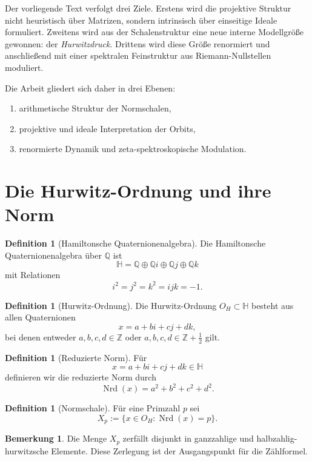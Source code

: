 \documentclass[a4paper,12pt]{article}
\theoremstyle{definition}
\newtheorem{definition}[satz]{Definition}
\newtheorem{bemerkung}[satz]{Bemerkung}
\numberwithin{equation}{section}
\newcommand{\OH}{O_H}
\newcommand{\HH}{\mathbb{H}}
\newcommand{\Q}{\mathbb{Q}}
\newcommand{\Z}{\mathbb{Z}}
\newcommand{\Nrd}{\operatorname{Nrd}}
\begin{document}
	Der vorliegende Text verfolgt drei Ziele. Erstens wird die projektive Struktur nicht heuristisch über Matrizen, sondern intrinsisch über einseitige Ideale formuliert. Zweitens wird aus der Schalenstruktur eine neue interne Modellgröße gewonnen: der \emph{Hurwitzdruck}. Drittens wird diese Größe renormiert und anschließend mit einer spektralen Feinstruktur aus Riemann-Nullstellen moduliert.
	
	Die Arbeit gliedert sich daher in drei Ebenen:
	
	\begin{enumerate}
		\item arithmetische Struktur der Normschalen,
		\item projektive und ideale Interpretation der Orbits,
		\item renormierte Dynamik und zeta-spektroskopische Modulation.
	\end{enumerate}
	
	\section{Die Hurwitz-Ordnung und ihre Norm}
	
	\begin{definition}[Hamiltonsche Quaternionenalgebra]
		Die Hamiltonsche Quaternionenalgebra über \(\Q\) ist
		\[
		\HH=\Q\oplus \Q i\oplus \Q j\oplus \Q k
		\]
		mit Relationen
		\[
		i^2=j^2=k^2=ijk=-1.
		\]
	\end{definition}
	
	\begin{definition}[Hurwitz-Ordnung]
		Die Hurwitz-Ordnung \(\OH\subset \HH\) besteht aus allen Quaternionen
		\[
		x=a+bi+cj+dk,
		\]
		bei denen entweder \(a,b,c,d\in \Z\) oder \(a,b,c,d\in \Z+\frac12\) gilt.
	\end{definition}
	
	\begin{definition}[Reduzierte Norm]
		Für
		\[
		x=a+bi+cj+dk\in \HH
		\]
		definieren wir die reduzierte Norm durch
		\[
		\Nrd(x)=a^2+b^2+c^2+d^2.
		\]
	\end{definition}
	
	\begin{definition}[Normschale]
		Für eine Primzahl \(p\) sei
		\[
		X_p:=\{x\in \OH:\Nrd(x)=p\}.
		\]
	\end{definition}
	
	\begin{bemerkung}
		Die Menge \(X_p\) zerfällt disjunkt in ganzzahlige und halbzahlig-hurwitzsche Elemente. Diese Zerlegung ist der Ausgangspunkt für die Zählformel.
	\end{bemerkung}
	
\end{document}

